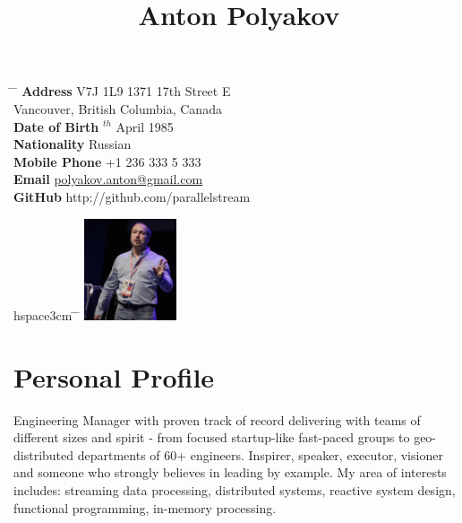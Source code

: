 \documentclass[10pt]{article} %
\begin{document}

\title{Anton Polyakov} %


\parbox{0.5\textwidth}{ %
    \begin{tabbing} %
        \hspace{3cm} \= \hspace{4cm} \= \kill %
        {\bf Address} \> V7J 1L9 1371 17th Street E\\ %
        \> Vancouver, British Columbia, Canada \\ %
        {\bf Date of Birth} $^{th}$ April 1985 \\ %
        {\bf Nationality} \> Russian \\ %
        {\bf Mobile Phone} \> +1 236 333 5 333 \\ %
        {\bf Email} \> \href{mailto:polyakov.anton@gmail.com}{polyakov.anton@gmail.com} \\ %
        {\bf GitHub} \> http://github.com/parallelstream %
    \end{tabbing}}
    \hfill %
    \parbox{0.5\textwidth}{ %
        \begin{tabbing} %
            hspace{3cm} \= \hspace{4cm} \= \kill %
            \includegraphics[height=3cm]{AntonPolyakov.jpg}
        \end{tabbing}
        }


        \section{Personal Profile}
        Engineering Manager with proven track of record delivering with teams of different sizes and spirit - from focused startup-like fast-paced groups to geo-distributed departments of 60+ engineers. Inspirer, speaker, executor, visioner and someone who strongly believes in leading by example.
        My area of interests includes: streaming data processing, distributed systems, reactive system design, functional programming, in-memory processing.
\end{document}
